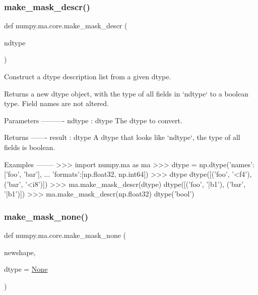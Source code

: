 \subsubsection{\texorpdfstring{make\+\_\+mask\+\_\+descr()}{make\_mask\_descr()}}
{\footnotesize\ttfamily def numpy.\+ma.\+core.\+make\+\_\+mask\+\_\+descr (\begin{DoxyParamCaption}\item[{}]{ndtype }\end{DoxyParamCaption})}

\begin{DoxyVerb}Construct a dtype description list from a given dtype.

Returns a new dtype object, with the type of all fields in `ndtype` to a
boolean type. Field names are not altered.

Parameters
----------
ndtype : dtype
    The dtype to convert.

Returns
-------
result : dtype
    A dtype that looks like `ndtype`, the type of all fields is boolean.

Examples
--------
>>> import numpy.ma as ma
>>> dtype = np.dtype({'names':['foo', 'bar'],
...                   'formats':[np.float32, np.int64]})
>>> dtype
dtype([('foo', '<f4'), ('bar', '<i8')])
>>> ma.make_mask_descr(dtype)
dtype([('foo', '|b1'), ('bar', '|b1')])
>>> ma.make_mask_descr(np.float32)
dtype('bool')\end{DoxyVerb}
 \mbox{\label{namespacenumpy_1_1ma_1_1core_af085abf4131ef0c7aaa49098f8129cfd}} 
\subsubsection{\texorpdfstring{make\+\_\+mask\+\_\+none()}{make\_mask\_none()}}
{\footnotesize\ttfamily def numpy.\+ma.\+core.\+make\+\_\+mask\+\_\+none (\begin{DoxyParamCaption}\item[{}]{newshape,  }\item[{}]{dtype = {\ttfamily \hyperlink{namespacenumpy_1_1ma_1_1core_a647ee1848dfa3692fe35a663a2aa40b3}{None}} }\end{DoxyParamCaption})}

